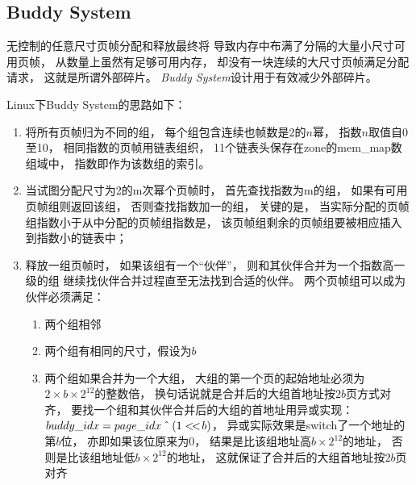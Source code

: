 \subsection{Buddy System}
无控制的任意尺寸页帧分配和释放最终将%
导致内存中布满了分隔的大量小尺寸可用页帧，
从数量上虽然有足够可用内存，
却没有一块连续的大尺寸页帧满足分配请求，
这就是所谓外部碎片。
{\em Buddy System}设计用于有效减少外部碎片。

Linux下Buddy System的思路如下：
\begin{enumerate}
  \item 将所有页帧归为不同的组，
    每个组包含连续也帧数是2的$n$幂，
    指数$n$取值自0至10，
    相同指数的页帧用链表组织，
    11个链表头保存在zone的mem\_map数组域中，
    指数即作为该数组的索引。
  \item 当试图分配尺寸为2的m次幂个页帧时，
    首先查找指数为m的组，
    如果有可用页帧组则返回该组，
    否则查找指数加一的组，
    关键的是，
    当实际分配的页帧组指数小于从中分配的页帧组指数是，
    该页帧组剩余的页帧组要被相应插入到指数小的链表中；
  \item 释放一组页帧时，
    如果该组有一个“伙伴”，
    则和其伙伴合并为一个指数高一级的组
    继续找伙伴合并过程直至无法找到合适的伙伴。
    两个页帧组可以成为伙伴必须满足：
    \begin{enumerate}
      \item 两个组相邻
      \item 两个组有相同的尺寸，假设为$b$
      \item 两个组如果合并为一个大组，
        大组的第一个页的起始地址必须为$2 \times b \times 2^{12}$的整数倍，
        换句话说就是合并后的大组首地址按$2b$页方式对齐，
        要找一个组和其伙伴合并后的大组的首地址用异或实现：
        $buddy\_idx = page\_idx \XOR (1 <\!<\! b)$，
        异或实际效果是switch了一个地址的第$b$位，
        亦即如果该位原来为0，
        结果是比该组地址高$b \times 2^{12}$的地址，
        否则是比该组地址低$b \times 2^{12}$的地址，
        这就保证了合并后的大组首地址按$2b$页对齐
    \end{enumerate}

\end{enumerate}

